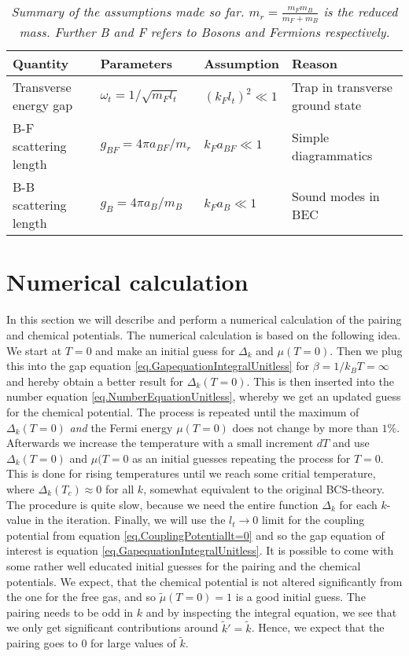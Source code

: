 \begin{table}[htb]
\centering
\caption{\textit{Summary of the assumptions made so far. $m_r = \frac{m_Fm_B}{m_F+m_B}$ is the reduced mass. Further B and F refers to Bosons and Fermions respectively.}}
\begin{tabular}{|l|l|l|l|}
\hline \textbf{Quantity} & \textbf{Parameters} & \textbf{Assumption}			& \textbf{Reason}	\\
\hline Transverse energy gap & $\omega_t = 1/\sqrt{m_Fl_t}$ & $(k_Fl_t)^2\ll 1$ & Trap in transverse ground state \\
\hline B-F scattering length& $g_{BF} = 4\pi a_{BF}/m_r$ 	& $k_Fa_{BF} \ll 1$	& Simple diagrammatics\\
\hline B-B scattering length  & $g_B = 4\pi a_B/m_B$		& $k_Fa_B 	 \ll 1$	& Sound modes in BEC  \\
\hline 
\end{tabular}
\label{tab.assumptions}
\end{table}

\section{Numerical calculation} \label{sec.pairingandchemicalpotential.numericalcalculation}
In this section we will describe and perform a numerical calculation of the pairing and chemical potentials. The numerical calculation is based on the following idea. We start at $T=0$ and make an initial guess for $\Delta_k$ and $\mu(T=0)$. Then we plug this into the gap equation \eqref{eq.GapequationIntegralUnitless} for $\beta = 1/k_BT = \infty$ and hereby obtain a better result for $\Delta_k(T=0)$. This is then inserted into the number equation \eqref{eq.NumberEquationUnitless}, whereby we get an updated guess for the chemical potential. The process is repeated until the maximum of $\Delta_k(T=0)$ \textit{and} the Fermi energy $\mu(T=0)$ does not change by more than $1\%$. Afterwards we increase the temperature with a small increment $dT$ and use $\Delta_k(T=0)$ and $\mu(T=0$ as an initial guesses repeating the process for $T=0$. This is done for rising temperatures until we reach some critial temperature, where $\Delta_k(T_c)\approx 0$ for all $k$, somewhat equivalent to the original BCS-theory\cite{Tinkham,LandauStatPhys2,PlischkeStatPhys}. The procedure is quite slow, because we need the entire function $\Delta_k$ for each $k$-value in the iteration. Finally, we will use the $l_t \to 0$ limit for the coupling potential from equation \eqref{eq.CouplingPotentiallt=0} and so the gap equation of interest is equation \eqref{eq.GapequationIntegralUnitless}. It is possible to come with some rather well educated initial guesses for the pairing and the chemical potentials. We expect, that the chemical potential is not altered significantly from the one for the free gas, and so $\tilde{\mu}(T = 0) = 1$ is a good initial guess. The pairing needs to be odd in $k$ and by inspecting the integral equation, we see that we only get significant contributions around $\tilde{k}' = \tilde{k}$. Hence, we expect that the pairing goes to 0 for large values of $\tilde{k}$.  

